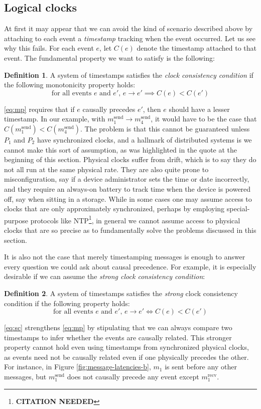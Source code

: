 \documentclass[]             %
{NASA}                       %
\theoremstyle{definition}
\newtheorem{definition}{Definition}[section]
\newcommand{\citationneeded}{\footnote{\textbf{CITATION NEEDED}}}
\begin{document}
\subsection{Logical clocks}
At first it may appear that we can avoid the kind of scenario
described above by attaching to each event a \emph{timestamp} tracking
when the event occurred. Let us see why this fails. For each event
$e$, let $C(e)$ denote the timestamp attached to that event. The
fundamental property we want to satisfy is the following:

\begin{definition}
  A system of timestamps satisfies the \emph{clock consistency
  condition} if the following monotonicity property holds:
  \[ \textrm{for all events $e$ and $e'$, } e \to e' \implies C(e) < C(e') \label{eq:mp}\tag{MP} \]
\end{definition}

\ref{eq:mp} requires that if $e$ causally precedes $e'$, then $e$
should have a lesser timestamp. In our example, with
$m_1^\textrm{send} \to m_4^\textrm{send}$, it would have to be the
case that $C(m_1^\textrm{send}) < C(m_4^\textrm{send})$. The problem
is that this cannot be guaranteed unless $P_1$ and $P_2$ have
synchronized clocks, and a hallmark of distributed systems is we
cannot make this sort of assumption, as was highlighted in the quote
at the beginning of this section.  Physical clocks suffer from drift,
which is to say they do not all run at the same physical rate. They
are also quite prone to misconfiguration, say if a device
administrator sets the time or date incorrectly, and they require an
always-on battery to track time when the device is powered off, say
when sitting in a storage. While in some cases one may assume access
to clocks that are only approximately synchronized, perhaps by
employing special-purpose protocols like NTP\citationneeded, in
general we cannot assume access to physical clocks that are so precise
as to fundamentally solve the problems discussed in this section.

It is also not the case that merely timestamping messages is enough to
answer every question we could ask about causal precedence. For
example, it is especially desirable if we can assume the \emph{strong
clock consistency condition}:
\begin{definition}
  A system of timestamps satisfies the \emph{strong} clock consistency
  condition if the following property holds:
  \[ \textrm{for all events $e$ and $e'$, } e \to e' \iff C(e) < C(e') \label{eq:sc}\tag{SC} \]
\end{definition}
\ref{eq:sc} strengthens \ref{eq:mp} by stipulating that we can always
compare two timestamps to infer whether the events are causally
related. This stronger property cannot hold even using timestamps from
synchronized physical clocks, as events need not be causally related
even if one physically precedes the other. For instance, in Figure
\ref{fig:message-latencies-b}, $m_1$ is sent before any other
messages, but $m_1^\textrm{send}$ does not causally precede any event
except $m_1^\textrm{recv}$.
\end{document}
